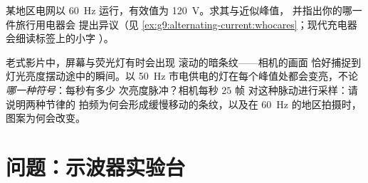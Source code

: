\begin{exercise}[$\star\star$]\label{exo:g9:alternating-current:11}
某地区电网以 \qty{60}{Hz} 运行，有效值为
\qty{120}{V}。求其与近似峰值，
并指出你的哪一件旅行用电器会
提出异议（见
\cref{ex:g9:alternating-current:whocares}；现代充电器会细读标签上的小字
）。
\end{exercise}

\begin{exercise}[$\star\star\star$]\label{exo:g9:alternating-current:12}
老式影片中，屏幕与荧光灯有时会出现
滚动的暗条纹——相机的画面
恰好捕捉到灯光亮度摆动途中的瞬间。以 \qty{50}{Hz}
市电供电的灯在每个峰值处都会变亮，不论\emph{哪一种符号}：每秒有多少
次亮度脉冲？相机每秒 $25$ 帧
对这种脉动进行采样：请说明两种节律的
拍频为何会形成缓慢移动的条纹，以及在
\qty{60}{Hz} 的地区拍摄时，图案为何会改变。
\end{exercise}

\section{问题：示波器实验台}

